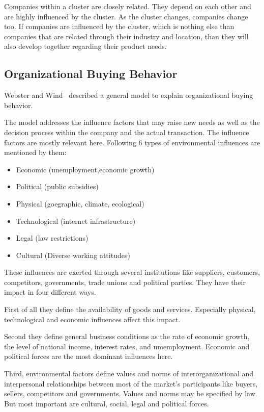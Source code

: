Companies within a cluster are closely related. They depend on each other and are highly influenced by the cluster.
As the cluster changes, companies change too. If companies are influenced by the cluster, which is nothing else
than companies that are related through their industry and location, than they will also develop together regarding
their product needs.

\subsection{Organizational Buying Behavior}
Webster and Wind~\cite{BusinessBuyingBehavior} described a general model to explain organizational buying behavior.

The model addresses the influence factors that may raise new needs as well as the
decision process within the company and the actual transaction. The influence factors are mostly relevant
here. Following 6 types of environmental influences are mentioned by them:

\begin{itemize}
  \item Economic (unemployment,economic growth)
  \item Political (public subsidies)
  \item Physical (goegraphic, climate, ecological)
  \item Technological (internet infrastructure)
  \item Legal (law restrictions)
  \item Cultural (Diverse working attitudes)
\end{itemize}

These influences are exerted through several institutions like suppliers, customers, competitors,
governments, trade unions and political parties. They have their impact in four different ways.

First of all they define the availability of goods and services. Especially physical, technological and economic
influences affect this impact.

Second they define general business conditions as the rate of economic growth, the level of national income,
interest rates, and umemployment. Economic and political forces are the most dominant influences here.

Third, environmental factors define values and norms of interorganizational and interpersonal relationships between
most of the market's participants like buyers, sellers, competitors and governments. Values and norms may be
specified by law. But most important are cultural, social, legal and political forces.

